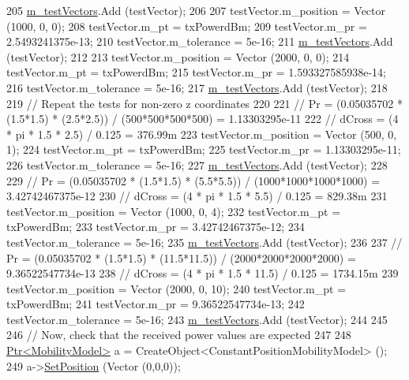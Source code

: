 \begin{DoxyCode}
205   \hyperlink{classTwoRayGroundPropagationLossModelTestCase_ab0bd335163cae1eb85b9947c853e28a5}{m\_testVectors}.Add (testVector);
206 
207   testVector.m\_position = Vector (1000, 0, 0);
208   testVector.m\_pt = txPowerdBm;
209   testVector.m\_pr = 2.5493241375e-13;
210   testVector.m\_tolerance = 5e-16;
211   \hyperlink{classTwoRayGroundPropagationLossModelTestCase_ab0bd335163cae1eb85b9947c853e28a5}{m\_testVectors}.Add (testVector);
212 
213   testVector.m\_position = Vector (2000, 0, 0);
214   testVector.m\_pt = txPowerdBm;
215   testVector.m\_pr = 1.593327585938e-14;
216   testVector.m\_tolerance = 5e-16;
217   \hyperlink{classTwoRayGroundPropagationLossModelTestCase_ab0bd335163cae1eb85b9947c853e28a5}{m\_testVectors}.Add (testVector);
218 
219   \textcolor{comment}{// Repeat the tests for non-zero z coordinates}
220 
221   \textcolor{comment}{// Pr = (0.05035702 * (1.5*1.5) * (2.5*2.5)) / (500*500*500*500) = 1.13303295e-11}
222   \textcolor{comment}{// dCross = (4 * pi * 1.5 * 2.5) / 0.125 = 376.99m}
223   testVector.m\_position = Vector (500, 0, 1);
224   testVector.m\_pt = txPowerdBm;
225   testVector.m\_pr = 1.13303295e-11;
226   testVector.m\_tolerance = 5e-16;
227   \hyperlink{classTwoRayGroundPropagationLossModelTestCase_ab0bd335163cae1eb85b9947c853e28a5}{m\_testVectors}.Add (testVector);
228 
229   \textcolor{comment}{// Pr = (0.05035702 * (1.5*1.5) * (5.5*5.5)) / (1000*1000*1000*1000) = 3.42742467375e-12}
230   \textcolor{comment}{// dCross = (4 * pi * 1.5 * 5.5) / 0.125 = 829.38m}
231   testVector.m\_position = Vector (1000, 0, 4);
232   testVector.m\_pt = txPowerdBm;
233   testVector.m\_pr = 3.42742467375e-12;
234   testVector.m\_tolerance = 5e-16;
235   \hyperlink{classTwoRayGroundPropagationLossModelTestCase_ab0bd335163cae1eb85b9947c853e28a5}{m\_testVectors}.Add (testVector);
236 
237   \textcolor{comment}{// Pr = (0.05035702 * (1.5*1.5) * (11.5*11.5)) / (2000*2000*2000*2000) = 9.36522547734e-13}
238   \textcolor{comment}{// dCross = (4 * pi * 1.5 * 11.5) / 0.125 = 1734.15m}
239   testVector.m\_position = Vector (2000, 0, 10);
240   testVector.m\_pt = txPowerdBm;
241   testVector.m\_pr = 9.36522547734e-13;
242   testVector.m\_tolerance = 5e-16;
243   \hyperlink{classTwoRayGroundPropagationLossModelTestCase_ab0bd335163cae1eb85b9947c853e28a5}{m\_testVectors}.Add (testVector);
244 
245 
246   \textcolor{comment}{// Now, check that the received power values are expected}
247 
248   \hyperlink{classns3_1_1Ptr}{Ptr<MobilityModel>} a = CreateObject<ConstantPositionMobilityModel> (); 
249   a->\hyperlink{classns3_1_1MobilityModel_ac584b3d5a309709d2f13ed6ada1e7640}{SetPosition} (Vector (0,0,0));

\end{DoxyCode}
